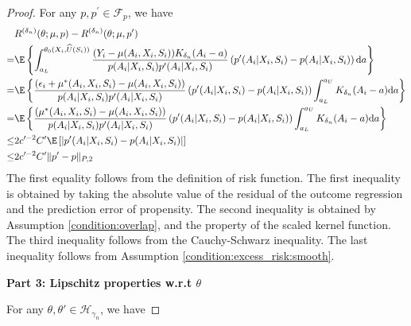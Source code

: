 \begin{proof}
\noindent For any $p,p^\prime\in \mathcal{F}_p$, we have 
\begin{align}
    &R^{({\delta_n})}(\theta;\mu, p) - R^{({\delta_n})}(\theta;\mu, p^\prime)\nonumber\\
    = &\E\left\{\int_{a_L}^{\theta_0(X_i,\widehat U(S_i))}  \frac{(Y_i -  \mu(A_i,X_i,S_i))K_{\delta_n}(A_i-a)}{ p(A_{i}|X_{i},S_{i})p^\prime(A_{i}|X_{i},S_{i})}\left(p^\prime(A_{i}|X_{i},S_{i}) -p(A_{i}|X_{i},S_{i})\right)\mathrm{d}a\right\}\nonumber\\
    = &\E\left\{ \frac{\left(\epsilon_i +\mu^*(A_i,X_i,S_i) -  \mu(A_i,X_i,S_i)\right)}{ p(A_{i}|X_{i},S_{i})p^\prime(A_{i}|X_{i},S_{i})}\left(p^\prime(A_{i}|X_{i},S_{i}) -p(A_{i}|X_{i},S_{i})\right)\int_{a_L}^{a_U}K_{\delta_n}(A_i-a)\mathrm{d}a\right\}\nonumber\\
    = &\E\left\{ \frac{\left(\mu^*(A_i,X_i,S_i) -  \mu(A_i,X_i,S_i)\right)}{ p(A_{i}|X_{i},S_{i})p^\prime(A_{i}|X_{i},S_{i})}\left(p^\prime(A_{i}|X_{i},S_{i}) -p(A_{i}|X_{i},S_{i})\right)\int_{a_L}^{a_U}K_{\delta_n}(A_i-a)\mathrm{d}a\right\}\nonumber\\
    \leq &2c^{\prime-2}C^{\prime}\E\left[\left|p^\prime(A_{i}|X_{i},S_{i}) -p(A_{i}|X_{i},S_{i})\right|\right]\nonumber\\
    \leq & 2c^{\prime-2}C^{\prime}\|p^\prime - p\|_{P,2}    \label{eq:lipschitz_to_p_E}
\end{align}
The first equality follows from the definition of risk function. The first inequality is obtained by taking the absolute value of the residual of the outcome regression and the prediction error of propensity. The second inequality is obtained by Assumption \ref{condition:overlap}, and the property of the scaled kernel function. The third inequality follows from the Cauchy-Schwarz inequality. The last inequality follows from Assumption \ref{condition:excess_risk:smooth}.

\noindent \textbf{Part 3: Lipschitz properties w.r.t $\theta$}

\noindent For any $\theta,\theta' \in\mathcal{H}_{\gamma_n}$, we have


\end{proof}

